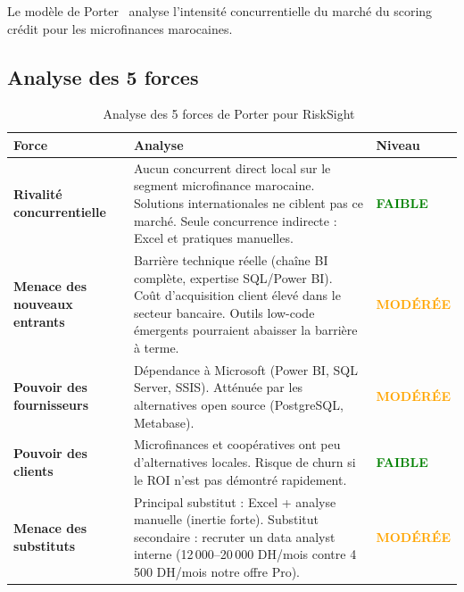 \documentclass[12pt, a4paper]{report}
\begin{document}
Le modèle de Porter~\cite{porter} analyse l'intensité concurrentielle du marché du
scoring crédit pour les microfinances marocaines.

\subsection{Analyse des 5 forces}

\begin{table}[H]
\centering
\caption{Analyse des 5 forces de Porter pour RiskSight~\cite{tp3_faisabilite}}
\label{tab:porter}
\renewcommand{\arraystretch}{1.5}
\setlength{\tabcolsep}{6pt}
\begin{tabularx}{\textwidth}{>{\bfseries\RaggedRight}p{3.5cm} >{\RaggedRight}X >{\centering\arraybackslash}p{2.5cm}}
\toprule
\rowcolor{primary!12}
\textbf{Force} & \textbf{Analyse} & \textbf{Niveau} \\
\midrule
Rivalité \newline concurrentielle & Aucun concurrent direct local sur le segment microfinance marocaine. Solutions internationales ne ciblent pas ce marché. Seule concurrence indirecte : Excel et pratiques manuelles. & \textcolor{green}{\textbf{FAIBLE}} \\
\midrule
Menace des \newline nouveaux entrants & Barrière technique réelle (chaîne BI complète, expertise SQL/Power BI). Coût d'acquisition client élevé dans le secteur bancaire. Outils low-code émergents pourraient abaisser la barrière à terme. & \textcolor{orange}{\textbf{MODÉRÉE}} \\
\midrule
Pouvoir des fournisseurs & Dépendance à Microsoft (Power BI, SQL Server, SSIS). Atténuée par les alternatives open source (PostgreSQL, Metabase). & \textcolor{orange}{\textbf{MODÉRÉE}} \\
\midrule
Pouvoir des clients & Microfinances et coopératives ont peu d'alternatives locales. Risque de churn si le ROI n'est pas démontré rapidement. & \textcolor{green}{\textbf{FAIBLE}} \\
\midrule
Menace des \newline substituts & Principal substitut : Excel + analyse manuelle (inertie forte). Substitut secondaire : recruter un data analyst interne (12\,000--20\,000 DH/mois contre 4\,500 DH/mois notre offre Pro). & \textcolor{orange}{\textbf{MODÉRÉE}} \\
\bottomrule
\end{tabularx}
\end{table}
\end{document}
